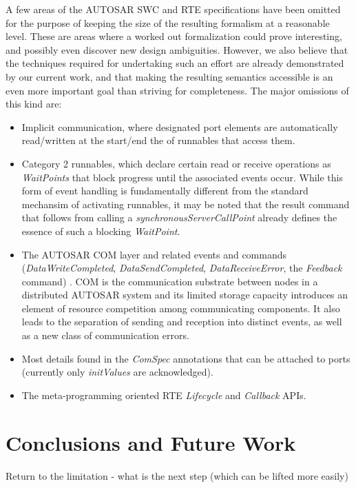 \documentclass[10pt,conference]{IEEEtran}
\begin{document}
A few areas of the AUTOSAR SWC and RTE specifications have been omitted for the purpose of keeping the size of the resulting formalism at a reasonable level. These are areas where a worked out formalization could prove interesting, and possibly even discover new design ambiguities. However, we also believe that the techniques required for undertaking such an effort are already demonstrated by our current work, and that making the resulting semantics accessible is an even more important goal than striving for completeness. The major omissions of this kind are:
\begin{itemize}
\item Implicit communication, where designated port elements are automatically read/written at the start/end the of runnables that access them.
\item Category 2 runnables, which declare certain read or receive operations as \emph{WaitPoints} that block progress until the associated events occur. While this form of event handling is fundamentally different from the standard mechansim of activating runnables, it may be noted that the result command that follows from calling a \emph{synchronousServerCallPoint} already defines the essence of such a blocking \emph{WaitPoint}.
\item The AUTOSAR COM layer and related events and commands (\emph{DataWriteCompleted}, \emph{DataSendCompleted}, \emph{DataReceiveError}, the {\em Feedback} command) \cite{AR:COM}. COM is the communication substrate between nodes in a distributed AUTOSAR system and its limited storage capacity introduces an element of resource competition among communicating components. It also leads to the separation of sending and reception into distinct events, as well as a new class of communication errors.
\item Most details found in the \emph{ComSpec} annotations that can be attached to ports (currently only \emph{initValues} are acknowledged).
\item The meta-programming oriented RTE {\em Lifecycle} and {\em Callback} APIs.
\end{itemize}


\section{Conclusions and Future Work}
\label{sec:Conc}

Return to the limitation - what is the next step (which can be lifted more easily)
\end{document}
